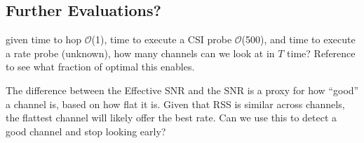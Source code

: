 \subsection{Further Evaluations?}
  given time to hop $\mathcal{O}$(1\ms), time to execute a CSI probe $\mathcal{O}$(500\us), and time to execute a rate probe (unknown), how many channels can we look at in $T$ time? Reference  to see what fraction of optimal this enables.

 The difference between the Effective SNR and the SNR is a proxy for how ``good'' a channel is, based on how flat it is. Given that RSS is similar across channels, the flattest channel will likely offer the best rate. Can we use this to detect a good channel and stop looking early?